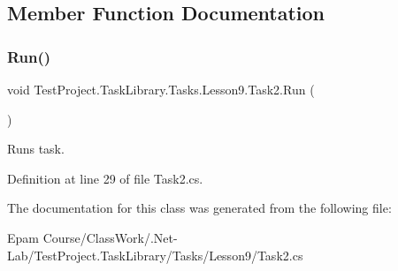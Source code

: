 \subsection{Member Function Documentation}
\mbox{\label{class_test_project_1_1_task_library_1_1_tasks_1_1_lesson9_1_1_task2_a932ed6bdd2d1c5de7f5ffafdf46dfb3a}} 
\subsubsection{\texorpdfstring{Run()}{Run()}}
{\footnotesize\ttfamily void Test\+Project.\+Task\+Library.\+Tasks.\+Lesson9.\+Task2.\+Run (\begin{DoxyParamCaption}{ }\end{DoxyParamCaption})}



Runs task. 



Definition at line 29 of file Task2.\+cs.



The documentation for this class was generated from the following file\+:\begin{DoxyCompactItemize}
\item 
Epam Course/\+Class\+Work/.\+Net-\/\+Lab/\+Test\+Project.\+Task\+Library/\+Tasks/\+Lesson9/Task2.\+cs\end{DoxyCompactItemize}
